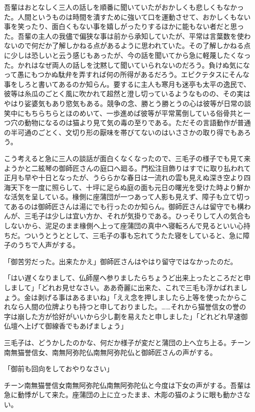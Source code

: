 \documentclass[12pt, openright]{book}
\begin{document}
吾輩はおとなしく三人の話しを順番に聞いていたがおかしくも悲しくもなかった。人間というものは時間を潰すために強いて口を運動させて、おかしくもない事を笑ったり、面白くもない事を嬉しがったりするほかに能もない者だと思った。吾輩の主人の我儘で偏狭な事は前から承知していたが、平常は言葉数を使わないので何だか了解しかねる点があるように思われていた。その了解しかねる点に少しは恐しいと云う感じもあったが、今の話を聞いてから急に軽蔑したくなった。かれはなぜ両人の話しを沈黙して聞いていられないのだろう。負けぬ気になって愚にもつかぬ駄弁を弄すれば何の所得があるだろう。エピクテタスにそんな事をしろと書いてあるのか知らん。要するに主人も寒月も迷亭も太平の逸民で、彼等は糸瓜のごとく風に吹かれて超然と澄し切っているようなものの、その実はやはり娑婆気もあり慾気もある。競争の念、勝とう勝とうの心は彼等が日常の談笑中にもちらちらとほのめいて、一歩進めば彼等が平常罵倒している俗骨共と一つ穴の動物になるのは猫より見て気の毒の至りである。ただその言語動作が普通の半可通のごとく、文切り形の厭味を帯びてないのはいささかの取り得でもあろう。

こう考えると急に三人の談話が面白くなくなったので、三毛子の様子でも見て来ようかと二絃琴の御師匠さんの庭口へ廻る。門松注目飾りはすでに取り払われて正月も早や十日となったが、うららかな春日は一流れの雲も見えぬ深き空より四海天下を一度に照らして、十坪に足らぬ庭の面も元日の曙光を受けた時より鮮かな活気を呈している。椽側に座蒲団が一つあって人影も見えず、障子も立て切ってあるのは御師匠さんは湯にでも行ったのか知らん。御師匠さんは留守でも構わんが、三毛子は少しは宜い方か、それが気掛りである。ひっそりして人の気合もしないから、泥足のまま椽側へ上って座蒲団の真中へ寝転ろんで見るといい心持ちだ。ついうとうととして、三毛子の事も忘れてうたた寝をしていると、急に障子のうちで人声がする。

「御苦労だった。出来たかえ」御師匠さんはやはり留守ではなかったのだ。

「はい遅くなりまして、仏師屋へ参りましたらちょうど出来上ったところだと申しまして」「どれお見せなさい。ああ奇麗に出来た、これで三毛も浮かばれましょう。金は剥げる事はあるまいね」「ええ念を押しましたら上等を使ったからこれなら人間の位牌よりも持つと申しておりました。\ldots{}\ldots{}それから猫誉信女の誉の字は崩した方が恰好がいいから少し劃を易えたと申しました」「どれどれ早速御仏壇へ上げて御線香でもあげましょう」

三毛子は、どうかしたのかな、何だか様子が変だと蒲団の上へ立ち上る。チーン南無猫誉信女、南無阿弥陀仏南無阿弥陀仏と御師匠さんの声がする。

「御前も回向をしておやりなさい」

チーン南無猫誉信女南無阿弥陀仏南無阿弥陀仏と今度は下女の声がする。吾輩は急に動悸がして来た。座蒲団の上に立ったまま、木彫の猫のように眼も動かさない。
\end{document}
